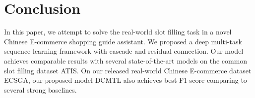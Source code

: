 \section{Conclusion}

In this paper, 
we attempt to solve the real-world slot filling task 
in a novel Chinese E-commerce shopping guide assistant. 
We proposed a deep multi-task sequence learning framework with 
cascade and residual connection. 
Our model achieves comparable results with 
several state-of-the-art models on the common slot filling dataset ATIS. 
On our released real-world Chinese E-commerce dataset ECSGA, 
our proposed model DCMTL also achieves best F1 score comparing 
to several strong baselines. 

